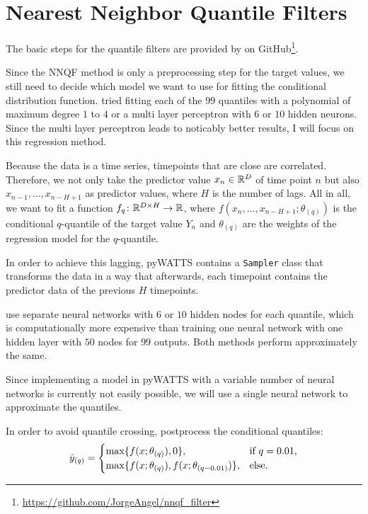 \section{Nearest Neighbor Quantile Filters}
\label{sec:implementation-nnqf}

The basic steps for the quantile filters are provided by \Textcite{Ordiano2019} 
on GitHub\footnote{\url{https://github.com/JorgeAngel/nnqf_filter}}. 

Since the NNQF method is only a preprocessing step for the target values, 
we still need to decide which model we want to use for fitting the 
conditional distribution function. 
\Textcite{Ordiano2019} tried fitting each of the \(99\) quantiles 
with a polynomial of maximum degree \(1\) to \(4\) or a multi layer perceptron 
with \(6\) or \(10\) hidden neurons. Since the multi layer perceptron leads to 
noticably better results, I will focus on this regression method. 

Because the data is a time series, timepoints that are close are correlated. 
Therefore, we not only take the predictor value \(x_n \in \mathbb{R}^D\) of time point \(n\) 
but also \(x_{n-1}, \ldots, x_{n-H+1}\) as predictor values, where \(H\) is the number of lags.
All in all, we want to fit a function \(f_q\colon \mathbb{R}^{D\times H} \rightarrow \mathbb{R}\), 
where \( f(x_n, \ldots, x_{n-H+1}; \theta_{(q)})\) is the conditional 
\(q\)-quantile of the target value \(Y_n\) and \(\theta_{(q)}\) are the weights 
of the regression model for the \(q\)-quantile.

In order to achieve this lagging, pyWATTS contains a \texttt{Sampler} class
that transforms the data in a way that afterwards, each timepoint contains the 
predictor data of the previous \(H\) timepoints.

\Textcite{Ordiano2019} use separate neural networks with \(6\) or \(10\) hidden nodes for each quantile, 
which is computationally more expensive than training one neural network with 
one hidden layer with \(50\) nodes for \(99\) outputs. 
Both methods perform approximately the same.  

Since implementing a model in pyWATTS with a variable number of neural networks is currently 
not easily possible, we will use a single neural network to approximate the quantiles.

In order to avoid quantile crossing, \Textcite{Ordiano2019} postprocess the conditional quantiles:
\[ \hat{y}_{(q)} = \begin{cases}
    \max\{ f(x; \theta_{(q)}), 0 \}, &\text{if } q = 0.01, \\
    \max\{ f(x; \theta_{(q)}), f(x; \theta_{(q-0.01)}) \}, &\text{else.}
\end{cases}\]

